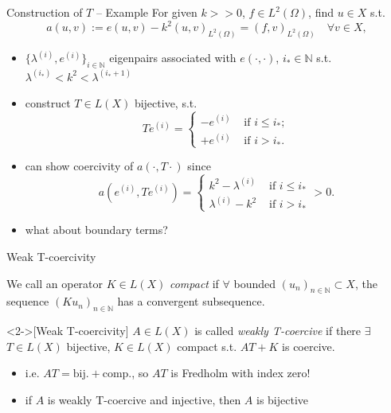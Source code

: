 \documentclass[11pt,aspectratio=169,xcolor=dvipsnames]{beamer}
\newcommand{\N}{\mathbb{N}}
\newcommand{\seq}[1]{(#1_n)_{n \in \N}}
\newcommand{\lami}{\lambda^{(i)}}
\newcommand{\ei}{e^{(i)}}
\newcommand{\nicearrow}[2]{\raisebox{#2}{\resizebox{0.45cm}{!}{\color{#1}{\MVRightArrow}\color{black}}}}
\begin{document}
\begin{frame}{Construction of $T$ -- Example}
  For given $k >\!\!> 0$, $f \in L^2(\Omega)$, find $u \in X$ s.t. 
  \begin{equation}\label{eq:HelmholtzAbstract}
    a(u,v) := e(u,v) - k^2(u,v)_{L^2(\Omega)} = (f,v)_{L^2(\Omega)} \quad \forall v \in X, \tag{P}
  \end{equation}
  \begin{itemize}
    \item<2->[\nicearrow{GOE}{-0.07cm}] $\{ \lami, \ei \}_{i \in \mathbb{N}}$ eigenpairs associated with $e(\cdot,\cdot)$, $i_{\ast} \in \mathbb{N}$ s.t. $\lambda^{(i_{\ast})} < k^2 < \lambda^{(i_{\ast} + 1)}$
    \item<3->[\nicearrow{GOE}{-0.07cm}] construct $T \in L(X)$ bijective, s.t. 
    \begin{equation*}
      T \ei = \begin{cases}
        - \ei &\text{ if } i \le i_{\ast}; \\
        + \ei &\text{ if } i > i_{\ast}.
      \end{cases}
    \end{equation*}
    \item<4->[\nicearrow{GOE}{-0.07cm}] can show coercivity of $a(\cdot,T \cdot)$ since 
    \begin{equation*}
      a(\ei,T \ei) = \begin{cases}
        k^2 - \lami &\text{ if } i \le i_{\ast} \\
        \lami - k^2 &\text{ if } i > i_{\ast}
      \end{cases} > 0.
    \end{equation*}
    \item<5->[\nicearrow{GOE}{-0.07cm}] what about boundary terms?
  \end{itemize}
\end{frame}



\begin{frame}{Weak T-coercivity}
    \begin{definition}
        We call an operator $K \in L(X)$ \emph{compact} if $\forall$ bounded $\seq{u} \subset X$, the sequence $\seq{K u}$ has a convergent subsequence.
    \end{definition}
    \begin{definition}<2->[Weak T-coercivity]
        $A \in L(X)$ is called \emph{weakly T-coercive} if there $\exists$ $T \in L(X)$ bijective, $K \in L(X)$ compact s.t. $AT + K$ is coercive.   
    \end{definition}
    \begin{itemize}
        \item<3->[\nicearrow{GOE}{-0.06cm}] i.e. $AT = \text{bij.} + \text{comp.}$, so $AT$ is Fredholm with index zero!
        \item<4->[\nicearrow{GOE}{-0.06cm}] if $A$ is weakly T-coercive and injective, then $A$ is bijective
    \end{itemize}
\end{frame}
\end{document}
